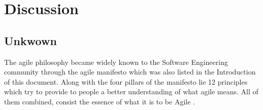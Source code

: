 
\chapter{Discussion}

\section{Unkwown}

The agile philosophy became widely known to the Software Engineering community through the agile manifesto \cite{beck2001agile} which was also listed in the Introduction of this document. Along with the four pillars of the manifesto lie 12 principles \cite{agile_principles} which try to provide to people a better understanding of what agile means. All of them combined, consist the essence of what it is to be Agile \cite{agile_alliance}.

